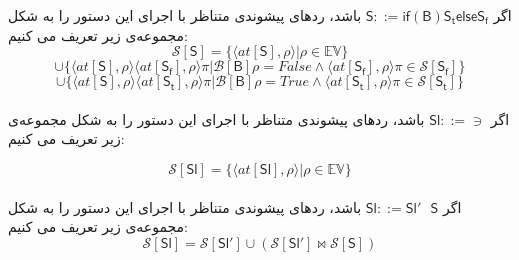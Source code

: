 اگر $         \mathsf{S} ::= \mathsf{if}  \mathsf{ (B) S_t else S_f}  $ باشد، ردهای پیشوندی متناظر با اجرای این دستور را به شکل مجموعه‌ی زیر تعریف می کنیم:
$$\mathcal{S} [\mathsf{S}] = \{ \langle at[\mathsf{S}] , \rho \rangle | \rho \in \mathbb{EV}       \} $$$$\cup     \{ \langle at[\mathsf{S}] , \rho \rangle \langle at[\mathsf{S_f}] , \rho \rangle 
\pi | \mathcal{B}[\mathsf{B}] \rho =False  \wedge   \langle  at[\mathsf{S_f}]  , \rho \rangle \pi \in \mathcal{S} [\mathsf{S_f}]    \}  
$$$$\cup    \{ \langle at[\mathsf{S}] , \rho \rangle \langle at[\mathsf{S_t}] , \rho \rangle 
\pi | \mathcal{B}[\mathsf{B}] \rho =True  \wedge   \langle  at[\mathsf{S_t}]  , \rho \rangle \pi \in \mathcal{S} [\mathsf{S_t}]    \}          $$ \\


اگر $         \mathsf{Sl} ::= \ni  $ باشد، ردهای پیشوندی متناظر با اجرای این دستور را به شکل مجموعه‌ی زیر تعریف می کنیم:

$$\mathcal{S} [\mathsf{Sl}] = \{ \langle at[\mathsf{Sl}] , \rho \rangle | \rho \in \mathbb{EV}       \}        $$ \\

اگر $         \mathsf{Sl} ::= \mathsf{Sl' \:\:\: S}  $ باشد، ردهای پیشوندی متناظر با اجرای این دستور را به شکل مجموعه‌ی زیر تعریف می کنیم:
$$\mathcal{S} [\mathsf{Sl}] = \mathcal{S} [\mathsf{Sl'}] \cup( \mathcal{S} [\mathsf{Sl'}]
\Join \mathcal{S} [\mathsf{S}] )      $$ \\




